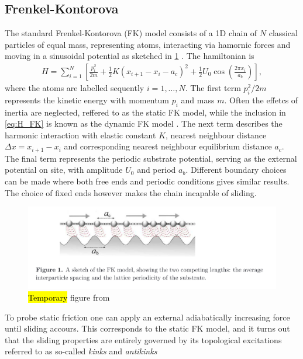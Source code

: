 
\subsection{Frenkel-Kontorova}

The standard Frenkel-Kontorova (FK) model consists of a 1D chain of $N$ classical
particles of equal mass, representing atoms, interacting via hamornic forces and moving in a sinusoidal potential as sketched in \cref{fig:FK_model} \cite{Manini_2016}. The hamiltonian is 
\begin{align}
  H = \sum_{i=1}^N \left[\frac{p_i^2}{2m} + \frac{1}{2}K(x_{i+1} - x_i - a_c)^2 + \frac{1}{2}U_0 \cos{\left(\frac{2\pi x_i}{a_b}\right)}\right],
  \label{eq:H_FK}
\end{align}
where the atoms are labelled sequently $i = 1, \hdots, N$. The first term $p_i^2/2m$ represents the kinetic energy with momentum $p_i$
and mass $m$. Often the effetcs of inertia are neglected, reffered to as the static FK model, while the inclusion in \cref{eq:H_FK} is known as the dynamic FK model \cite{FK2D}. The next term describes the harmonic interaction with elastic
constant $K$, nearest neighbour distance $\Delta x = x_{i+1} - x_i$ and 
corresponding nearest neighbour equilibrium distance $a_c$. The final term represents the periodic substrate potential, serving as the external potential on site, with amplitude $U_0$ and period $a_b$. Different boundary choices can be made where both free ends and periodic conditions gives similar results. The choice of fixed ends however makes the chain incapable of sliding.

\begin{figure}[H]
  \centering
  \includegraphics[width=0.8\linewidth]{figures/theory/FK_model.png}
  \caption{\hl{Temporary} figure from \cite{Manini_2016}}
  \label{fig:FK_model}
\end{figure}

To probe static friction one can apply an external adiabatically increasing force until sliding accours. This corresponds to the static FK model, and it turns out that the sliding properties are entirely governed by its topological excitations referred to as so-called \textit{kinks} and \textit{antikinks}

